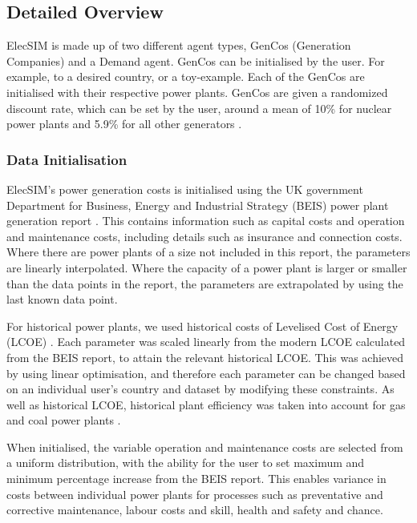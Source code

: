 \subsection{Detailed Overview}

ElecSIM is made up of two different agent types, GenCos (Generation Companies) and a Demand agent. GenCos can be initialised by the user. For example, to a desired country, or a toy-example. Each of the GenCos are initialised with their respective power plants. GenCos are given a randomized discount rate, which can be set by the user, around a mean of 10\% for nuclear power plants \cite{Paper2012} and 5.9\% for all other generators \cite{KPMG2017}.

\subsubsection{Data Initialisation}ElecSIM's power generation costs is initialised using the UK government Department for Business, Energy and Industrial Strategy (BEIS) power plant generation report \cite{Department2016}. This contains information such as capital costs and operation and maintenance costs, including details such as insurance and connection costs. Where there are power plants of a size not included in this report, the parameters are linearly interpolated. Where the capacity of a power plant is larger or smaller than the data points in the report, the parameters are extrapolated by using the last known data point.

For historical power plants, we used historical costs of Levelised Cost of Energy (LCOE) \cite{Dale2013}. Each parameter was scaled linearly from the modern LCOE calculated from the BEIS report, to attain the relevant historical LCOE. This was achieved by using linear optimisation, and therefore each parameter can be changed based on an individual user's country and dataset by modifying these constraints. As well as historical LCOE, historical plant efficiency was taken into account for gas and coal power plants \cite{EIA2013}.

When initialised, the variable operation and maintenance costs are selected from a uniform distribution, with the ability for the user to set maximum and minimum percentage increase from the BEIS report. This enables variance in costs between individual power plants for processes such as preventative and corrective maintenance, labour costs and skill, health and safety and chance.  

